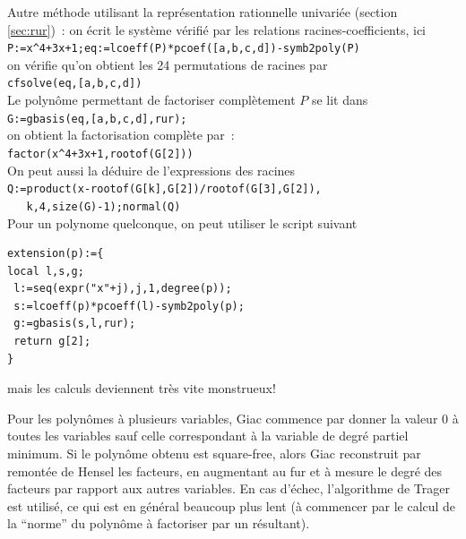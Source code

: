 \documentclass[a4paper,11pt]{book}
\begin{document}
\begin{giacjshere}
Autre m\'ethode utilisant la repr\'esentation rationnelle
univari\'ee (section \ref{sec:rur})~: 
on \'ecrit le syst\`eme v\'erifi\'e par les relations
racines-coefficients, ici\\
\verb|P:=x^4+3x+1;eq:=lcoeff(P)*pcoef([a,b,c,d])-symb2poly(P)|\\
on v\'erifie qu'on obtient les 24 permutations de racines par\\
\verb|cfsolve(eq,[a,b,c,d])|\\
Le polyn\^ome permettant de factoriser compl\`etement $P$ se lit dans\\
\verb|G:=gbasis(eq,[a,b,c,d],rur);|\\
on obtient la factorisation compl\`ete par~:\\
\verb|factor(x^4+3x+1,rootof(G[2]))|\\
On peut aussi la d\'eduire de l'expressions des racines\\
\verb|Q:=product(x-rootof(G[k],G[2])/rootof(G[3],G[2]),|\\
\verb|   k,4,size(G)-1);normal(Q)|\\
Pour un polynome quelconque, on peut utiliser le script suivant\\
\begin{verbatim}
extension(p):={
local l,s,g;
 l:=seq(expr("x"+j),j,1,degree(p));
 s:=lcoeff(p)*pcoeff(l)-symb2poly(p);
 g:=gbasis(s,l,rur);
 return g[2];
}
\end{verbatim}
mais les calculs deviennent tr\`es vite monstrueux!

Pour les polyn\^omes \`a plusieurs variables, Giac commence par donner
la valeur 0 \`a toutes les variables sauf celle correspondant \`a la variable de
degr\'e partiel minimum. Si le polyn\^ome obtenu est square-free, alors Giac
reconstruit par remont\'ee de Hensel les facteurs, en augmentant
au fur et \`a mesure le degr\'e des facteurs par rapport aux autres
variables. En cas d'\'echec, l'algorithme de Trager est utilis\'e,
ce qui est en g\'en\'eral beaucoup plus lent (\`a commencer par le
calcul de la ``norme'' du polyn\^ome \`a factoriser par un r\'esultant).


\end{giacjshere}
\end{document}
